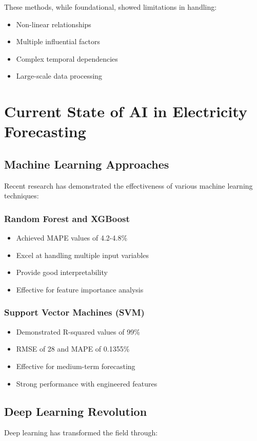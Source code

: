 \documentclass[12pt,a4paper]{report}
\begin{document}
These methods, while foundational, showed limitations in handling:
\begin{itemize}
\item Non-linear relationships
\item Multiple influential factors
\item Complex temporal dependencies
\item Large-scale data processing
\end{itemize}

\section{Current State of AI in Electricity Forecasting}

\subsection{Machine Learning Approaches}
Recent research has demonstrated the effectiveness of various machine learning techniques:

\subsubsection{Random Forest and XGBoost}
\begin{itemize}
\item Achieved MAPE values of 4.2-4.8\%
\item Excel at handling multiple input variables
\item Provide good interpretability
\item Effective for feature importance analysis
\end{itemize}

\subsubsection{Support Vector Machines (SVM)}
\begin{itemize}
\item Demonstrated R-squared values of 99\%
\item RMSE of 28 and MAPE of 0.1355\%
\item Effective for medium-term forecasting
\item Strong performance with engineered features
\end{itemize}

\subsection{Deep Learning Revolution}
Deep learning has transformed the field through:
\end{document}
